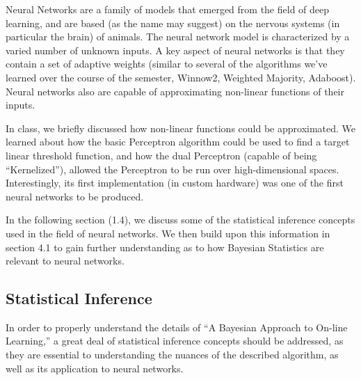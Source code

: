 																																																																					    Neural Networks are a family of models that emerged from the field of deep learning, and are based (as the name may suggest) on the nervous systems (in particular the brain) of animals. The neural network model is characterized by a varied number of unknown inputs. A key aspect of neural networks is that they contain a set of adaptive weights (similar to several of the algorithms we’ve learned over the course of the semester, Winnow2, Weighted Majority, Adaboost). Neural networks also are capable of approximating non-linear functions of their inputs.  \vspace{4mm}

																																																																						    \noindent In class, we briefly discussed how non-linear functions could be approximated. We learned about how the basic Perceptron algorithm could be used to find a target linear threshold function, and how the dual Perceptron (capable of being “Kernelized”), allowed the Perceptron to be run over high-dimensional spaces. Interestingly, its first implementation (in custom hardware) was one of the first neural networks to be produced. \vspace{4mm}
																																																																							    
																																																																								    \noindent In the following section (1.4), we discuss some of the statistical inference concepts used in the field of neural networks. We then build upon this information in section 4.1 to gain further understanding as to how Bayesian Statistics are relevant to neural networks. 
																																																																									    
																																																																										    \subsection{Statistical Inference} 
																																																																											        In order to properly understand the details of ``A Bayesian Approach to On-line Learning,'' a great deal of statistical inference concepts should be addressed, as they are essential to understanding the nuances of the described algorithm, as well as its application to neural networks.
																																																																													        \vspace{4mm}
																																																																															        
